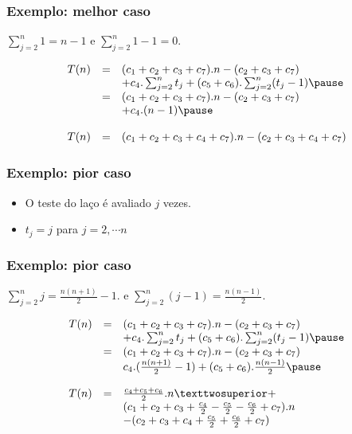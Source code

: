 \documentclass{beamer}
\begin{document}
\begin{frame}

\frametitle{Exemplo: melhor caso}

$\sum_{j=2}^{n} 1 = n-1$ e $\sum_{j=2}^{n} 1 - 1 = 0$.

  $$
  \begin{array}{rcl}
    T(n) & = & (c_1+c_2+c_3+c_7).n  - (c_2 + c_3 + c_7) \\
    & & + c_4.\sum_{j=2}^{n} t_j+ (c_5+c_6).\sum_{j=2}^{n} (t_j-1) \pause \\
    & = & (c_1+c_2+c_3+c_7).n - (c_2 + c_3 +c_7) \\
    & & + c_4.(n-1) \pause \\
    \\
    T(n) & = & (c_1+c_2+c_3+c_4+c_7).n - (c_2 + c_3 + c_4 + c_7)
  \end{array}
  $$

\end{frame}

\begin{frame}

\frametitle{Exemplo: pior caso}

  

  \begin{itemize}
    \item O teste do laço é avaliado $j$ vezes.
    \item $t_j = j$ para $j = 2, \cdots n$
  \end{itemize}

\end{frame}

\begin{frame}

\frametitle{Exemplo: pior caso}

$\sum_{j=2}^{n} j = \frac{n(n+1)}{2} - 1.$
e
$\sum_{j=2}^{n} (j-1) = \frac{n(n-1)}{2}.$

  $$
  \begin{array}{rcl}
    T(n) & = & (c_1+c_2+c_3+c_7).n  - (c_2 + c_3 + c_7) \\
    & & + c_4.\sum_{j=2}^{n} t_j+ (c_5+c_6).\sum_{j=2}^{n} (t_j-1) \pause \\
    & = & (c_1+c_2+c_3+c_7).n - (c_2 + c_3 + c_7) \\
    & & c_4.(\frac{n(n+1)}{2} - 1) + (c_5+c_6).\frac{n(n-1)}{2} \pause \\
    \\
    T(n)
    & = & \frac{c_4+c_5+c_6}{2}.n² + \\
    & &   (c_1+c_2+c_3+\frac{c_4}{2}-\frac{c_5}{2}-\frac{c_6}{2} + c_7).n \\
    & & - (c_2 + c_3 + c_4 + \frac{c_5}{2} + \frac{c_6}{2} + c_7)
  \end{array}
  $$

\end{frame}
\end{document}
